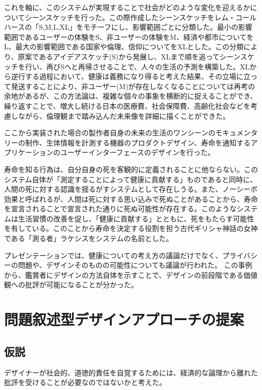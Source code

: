 \documentclass{jsarticle}
\begin{document}
これを軸に、このシステムが実現することで社会がどのような変化を迎えるかについてシーンスケッチを行った。この際作成したシーンスケッチをレム・コールハースの「S,M,L,XL」をモチーフにし、影響範囲ごとに分類した。最小の影響範囲であるユーザーの体験をS、非ユーザーの体験をM、経済や都市についてをL、最大の影響範囲である国家や倫理、信仰についてをXLとした。この分類により、原案であるアイデアスケッチ(S)から発展し、XLまで順を追ってシーンスケッチを行い、再びSへと再帰させることで、人々の生活の予測を構築した。XLから逆行する過程において、健康は義務になり得ると考えた結果、その立場に立って発送することにより、非ユーザー(M)が存在しなくなることについては再考の余地があるが、この方法論は、複雑な個々の事象を横断的に捉えることができ、繰り返すことで、増大し続ける日本の医療費、社会保障費、高齢化社会などを考慮しながら、倫理観まで踏み込んだ未来像を詳細に描くことができた。

ここから実装された場合の製作者自身の未来の生活のワンシーンのモキュメンタリーの制作、生体情報を計測する機器のプロダクトデザイン、寿命を通知するアプリケーションのユーザーインターフェースのデザインを行った。

寿命を知る行為は、自分自身の死を客観的に定義されることに他ならない。このシステム自体が「測定することによって健康に貢献する」ものであると同時に、人間の死に対する認識を揺るがすシステムとして存在しうる。また、ノーシーボ効果と呼ばれるが、人間は死に対する思い込みで死ぬことがあることから、寿命を宣言されることで宣言された通りに死ぬ可能性が存在する。このようなシステムは生活習慣の改善を促し、「健康に貢献する」とともに、死をもたらす可能性を有している。このことから寿命を決定する役割を担う古代ギリシャ神話の女神である「測る者」ラケシスをシステムの名前とした。

プレゼンテーションでは、健康についての考え方の議論だけでなく、プライバシーの問題や、デザインそのものの可能性についても議論が行われた。
この事例から、鑑賞者にデザインの方法自体を示すことで、デザインの前段階である価値観への批評が可能になることが分かった。


\newpage

\section{問題叙述型デザインアプローチの提案}

\subsection{仮説}



デザイナーが社会的、道徳的責任を自覚するためには、経済的な論理から離れた批評を受けることが必要なのではないかと考えた。
\end{document}
